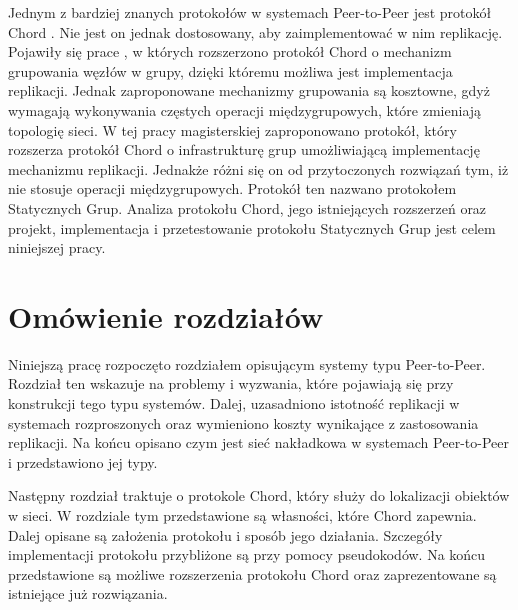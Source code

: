 \documentclass[12pt, twoside, openany]{report}
\begin{document}
Jednym z bardziej znanych protokołów w systemach Peer-to-Peer jest protokół Chord \cite{bib:paiva}. Nie jest on jednak dostosowany, aby zaimplementować w nim replikację. Pojawiły się prace \cite{bib:scatter, bib:rollerchain}, w których rozszerzono protokół Chord o mechanizm grupowania węzłów w grupy, dzięki któremu możliwa jest implementacja replikacji. Jednak zaproponowane mechanizmy grupowania są kosztowne, gdyż wymagają wykonywania częstych operacji międzygrupowych, które zmieniają topologię sieci. W tej pracy magisterskiej zaproponowano protokół, który rozszerza protokół Chord o infrastrukturę grup umożliwiającą implementację mechanizmu replikacji. Jednakże różni się on od przytoczonych rozwiązań tym, iż nie stosuje operacji międzygrupowych. Protokół ten nazwano protokołem Statycznych Grup. Analiza protokołu Chord, jego istniejących rozszerzeń oraz projekt, implementacja i przetestowanie protokołu Statycznych Grup jest celem niniejszej pracy.

\section{Omówienie rozdziałów}

Niniejszą pracę rozpoczęto rozdziałem opisującym systemy typu Peer-to-Peer. Rozdział ten wskazuje na problemy i wyzwania, które pojawiają się przy konstrukcji tego typu systemów. Dalej, uzasadniono istotność replikacji w systemach rozproszonych oraz wymieniono koszty wynikające z zastosowania replikacji. Na końcu opisano czym jest sieć nakładkowa w systemach Peer-to-Peer i przedstawiono jej typy.

Następny rozdział traktuje o protokole Chord, który służy do lokalizacji obiektów w sieci. W rozdziale tym przedstawione są własności, które Chord zapewnia. Dalej opisane są założenia protokołu i sposób jego działania. Szczegóły implementacji protokołu przybliżone są przy pomocy pseudokodów. Na końcu przedstawione są możliwe rozszerzenia protokołu Chord oraz zaprezentowane są istniejące już rozwiązania.
\end{document}
